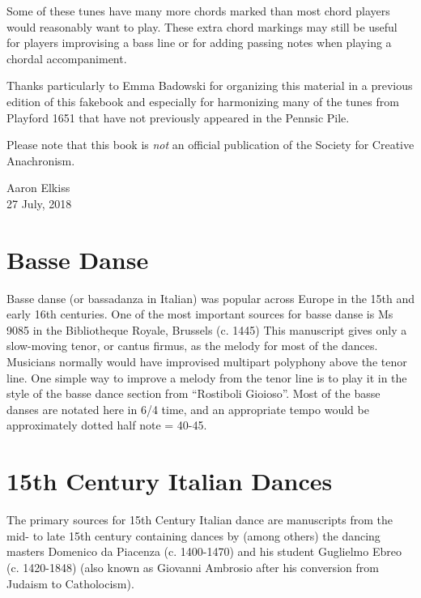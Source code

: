 \documentclass[11pt]{book}
\begin{document}
Some of these tunes have many more chords marked than most chord players would
reasonably want to play. These extra chord markings may still be useful for
players improvising a bass line or for adding passing notes when playing a
chordal accompaniment.

Thanks particularly to Emma Badowski for organizing this material in a previous
edition of this fakebook and especially for harmonizing many of the tunes from
Playford 1651 that have not previously appeared in the Pennsic Pile.

Please note that this book is {\em not} an official publication of the Society
for Creative Anachronism.

Aaron Elkiss \\
27 July, 2018

\clearpage
\begin{multicols}{2}

\renewcommand\cftchapafterpnum{\vskip\baselineskip}
\setlength{\cftsubsecindent}{0pt}
\setlength{\cftsubsecnumwidth}{0pt}
\tableofcontents
\end{multicols}

\clearpage
\mainmatter
\renewcommand{\abcwidth}{1.0\linewidth}

\chapter{Basse Danse}

Basse danse (or bassadanza in Italian) was popular across Europe in the 15th
and early 16th centuries. One of the most important sources for basse danse is
Ms 9085 in the Bibliotheque Royale, Brussels (c. 1445) This manuscript gives
only a slow-moving tenor, or cantus firmus, as the melody for most of the
dances. Musicians normally would have improvised multipart polyphony above the
tenor line. One simple way to improve a melody from the tenor line is to play
it in the style of the basse dance section from ``Rostiboli Gioioso''.  Most of
the basse danses are notated here in 6/4 time, and an appropriate tempo would
be approximately dotted half note = 40-45.

\clearpage



\chapter{15th Century Italian Dances}

The primary sources for 15th Century Italian dance are manuscripts from the
mid- to late 15th century containing dances by (among others) the dancing
masters Domenico da Piacenza (c. 1400-1470) and his student Guglielmo Ebreo (c.
1420-1848) (also known as Giovanni Ambrosio after his conversion from Judaism
to Catholocism).
\end{document}
